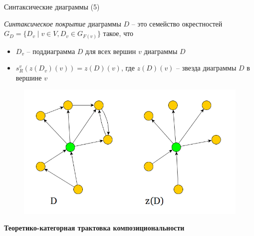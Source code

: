 \documentclass{beamer}
\begin{document}
\begin{frame}{Синтаксические диаграммы (5)}
\bigskip
\begin{small}
\textit{Синтаксическое покрытие} диаграммы $D$ -- это семейство окрестностей $G_D = \{ D_v \; \vert \; v \in V, D_v \in G_{F(v)} \}$ такое, что\\
\medskip
\begin{itemize}
	\item $D_v$ -- поддиаграмма $D$ для всех вершин $v$ диаграммы $D$
	\item $s^v_R(z(D_v)(v)) = z(D)(v)$, где $z(D)(v)$ -- звезда диаграммы $D$ в вершине $v$
\end{itemize}

\end{small}
\begin{figure}[H]
\includegraphics[scale=0.25]{star.png} 
\end{figure}

\end{frame}






\begin{frame}{}
\begin{center}
	\textbf{Теоретико-категорная трактовка композициональности}
\end{center}
\end{frame}
\end{document}

